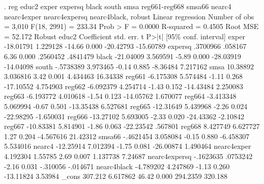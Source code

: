 . reg educ2 exper expersq black south smsa reg661-reg668 smsa66 nearc4 nearc4exper nearc4expersq nearc4black, robust
{\smallskip}
Linear regression                               Number of obs     =      3,010
                                                F(18, 2991)       =     233.34
                                                Prob > F          =     0.0000
                                                R-squared         =     0.4505
                                                Root MSE          =     52.172
{\smallskip}
              {\VBAR}               Robust
        educ2 {\VBAR} Coefficient  std. err.      t    P>|t|     [95\% conf. interval]
        exper {\VBAR}  -18.01791   1.229128   -14.66   0.000    -20.42793   -15.60789
      expersq {\VBAR}   .3700966    .058167     6.36   0.000     .2560452    .4841479
        black {\VBAR}  -21.04009   3.569591    -5.89   0.000    -28.03919   -14.04098
        south {\VBAR}  -.5738389   3.973465    -0.14   0.885     -8.36484    7.217162
         smsa {\VBAR}   10.38892   3.036816     3.42   0.001     4.434463    16.34338
       reg661 {\VBAR}  -6.175308   5.574484    -1.11   0.268    -17.10552    4.754903
       reg662 {\VBAR}  -6.092379   4.254714    -1.43   0.152    -14.43484    2.250083
       reg663 {\VBAR}  -6.193772   4.010618    -1.54   0.123    -14.05762    1.670077
       reg664 {\VBAR}  -3.413348   5.069994    -0.67   0.501    -13.35438    6.527681
       reg665 {\VBAR}  -12.31649   5.439968    -2.26   0.024    -22.98295   -1.650031
       reg666 {\VBAR}  -13.27102   5.693005    -2.33   0.020    -24.43362    -2.10842
       reg667 {\VBAR}  -10.83381   5.814901    -1.86   0.063    -22.23542     .567801
       reg668 {\VBAR}   8.427749   6.627727     1.27   0.204    -4.567616    21.42312
       smsa66 {\VBAR}  -.4621454   3.058084    -0.15   0.880    -6.458307    5.534016
       nearc4 {\VBAR}  -12.25914   7.012394    -1.75   0.081    -26.00874    1.490464
  nearc4exper {\VBAR}   4.192304    1.55785     2.69   0.007     1.137738     7.24687
nearc4expersq {\VBAR}  -.1623635   .0753242    -2.16   0.031     -.310056    -.014671
  nearc4black {\VBAR}  -4.789202   4.247869    -1.13   0.260    -13.11824     3.53984
        _cons {\VBAR}    307.212   6.617862    46.42   0.000     294.2359     320.188
{\smallskip}
